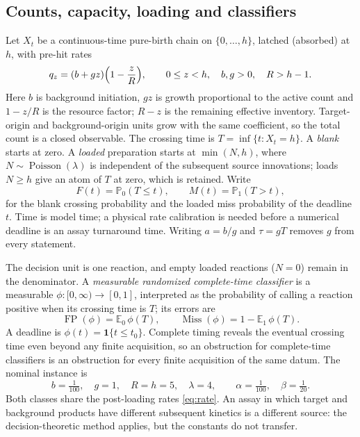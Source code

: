 \documentclass[11pt,a4paper]{article}
\theoremstyle{plain}
\theoremstyle{definition}
\theoremstyle{remark}
\newcommand{\E}{\mathbb E}
\newcommand{\Prob}{\mathbb P}
\newcommand{\FP}{\operatorname{FP}}
\newcommand{\Miss}{\operatorname{Miss}}
\newcommand{\Poi}{\operatorname{Poisson}}
\newcommand{\one}{\mathbf 1}
\begin{document}
\subsection{Counts, capacity, loading and classifiers}
Let $X_t$ be a continuous-time pure-birth chain on $\{0,\dots,h\}$, latched (absorbed) at $h$, with pre-hit rates
\begin{equation}\label{eq:rate}
q_z=(b+gz)\Bigl(1-\frac zR\Bigr),\qquad 0\le z<h,\quad b,g>0,\quad R>h-1.
\end{equation}
Here $b$ is background initiation, $gz$ is growth proportional to the active count and $1-z/R$ is the resource factor; $R-z$ is the remaining effective inventory. Target-origin and background-origin units grow with the same coefficient, so the total count is a closed observable. The crossing time is $T=\inf\{t:X_t=h\}$. A \emph{blank} starts at zero. A \emph{loaded} preparation starts at $\min(N,h)$, where $N\sim\Poi(\lambda)$ is independent of the subsequent source innovations; loads $N\ge h$ give an atom of $T$ at zero, which is retained. Write
\[
F(t)=\Prob_0(T\le t),\qquad M(t)=\Prob_1(T>t),
\]
for the blank crossing probability and the loaded miss probability of the deadline $t$. Time is model time; a physical rate calibration is needed before a numerical deadline is an assay turnaround time. Writing $a=b/g$ and $\tau=gT$ removes $g$ from every statement.

The decision unit is one reaction, and empty loaded reactions ($N=0$) remain in the denominator. A \emph{measurable randomized complete-time classifier} is a measurable $\phi:[0,\infty)\to[0,1]$, interpreted as the probability of calling a reaction positive when its crossing time is $T$; its errors are
\begin{equation}\label{eq:errors}
\FP(\phi)=\E_0\,\phi(T),\qquad \Miss(\phi)=1-\E_1\,\phi(T).
\end{equation}
A deadline is $\phi(t)=\one\{t\le t_0\}$. Complete timing reveals the eventual crossing time even beyond any finite acquisition, so an obstruction for complete-time classifiers is an obstruction for every finite acquisition of the same datum. The nominal instance is
\begin{equation}\label{eq:nominal}
b=\tfrac1{100},\quad g=1,\quad R=h=5,\quad\lambda=4,\qquad\alpha=\tfrac1{100},\quad\beta=\tfrac1{20}.
\end{equation}
Both classes share the post-loading rates \eqref{eq:rate}. An assay in which target and background products have different subsequent kinetics is a different source: the decision-theoretic method applies, but the constants do not transfer.
\end{document}
